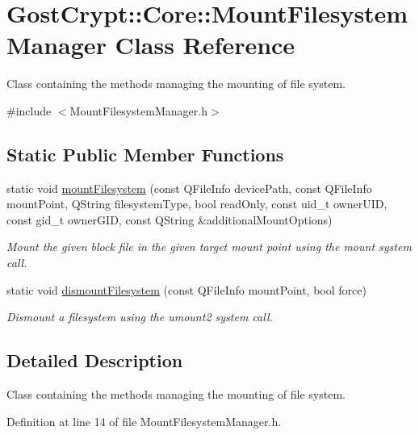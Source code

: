 \hypertarget{class_gost_crypt_1_1_core_1_1_mount_filesystem_manager}{}\section{Gost\+Crypt\+:\+:Core\+:\+:Mount\+Filesystem\+Manager Class Reference}
\label{class_gost_crypt_1_1_core_1_1_mount_filesystem_manager}


Class containing the methods managing the mounting of file system.  




{\ttfamily \#include $<$Mount\+Filesystem\+Manager.\+h$>$}

\subsection*{Static Public Member Functions}
\begin{DoxyCompactItemize}
\item 
static void \hyperlink{class_gost_crypt_1_1_core_1_1_mount_filesystem_manager_a1f286d145af83b982efc939f85530c27}{mount\+Filesystem} (const Q\+File\+Info device\+Path, const Q\+File\+Info mount\+Point, Q\+String filesystem\+Type, bool read\+Only, const uid\+\_\+t owner\+U\+ID, const gid\+\_\+t owner\+G\+ID, const Q\+String \&additional\+Mount\+Options)
\begin{DoxyCompactList}\small\item\em Mount the given block file in the given target mount point using the mount system call. \end{DoxyCompactList}\item 
static void \hyperlink{class_gost_crypt_1_1_core_1_1_mount_filesystem_manager_ae545bc95f5aedaf13886b57c00bd8c3e}{dismount\+Filesystem} (const Q\+File\+Info mount\+Point, bool force)
\begin{DoxyCompactList}\small\item\em Dismount a filesystem using the umount2 system call. \end{DoxyCompactList}\end{DoxyCompactItemize}


\subsection{Detailed Description}
Class containing the methods managing the mounting of file system. 

Definition at line 14 of file Mount\+Filesystem\+Manager.\+h.



